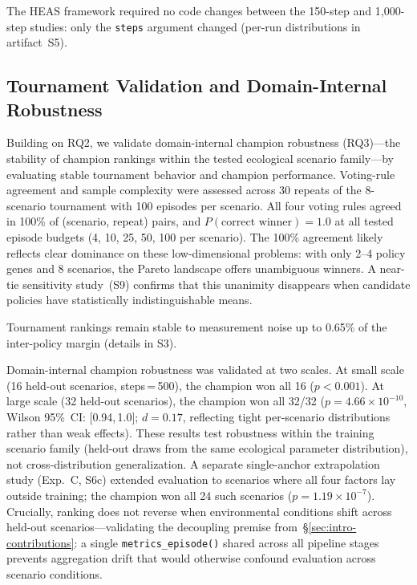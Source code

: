 \documentclass{wscpaperproc}
\begin{document}
The HEAS framework required no code changes between the 150-step
and 1,000-step studies: only the \texttt{steps} argument changed
(per-run distributions in artifact~S5).

\subsection{Tournament Validation and Domain-Internal Robustness}
\label{sec:tournament}

Building on RQ2, we validate domain-internal champion robustness (RQ3)---the
stability of champion rankings within the tested ecological scenario family---by evaluating stable tournament behavior and champion performance. Voting-rule agreement and sample complexity
were assessed across 30 repeats of
the 8-scenario tournament with 100 episodes per scenario. All four voting rules
agreed in 100\% of
(scenario, repeat) pairs, and $P(\text{correct winner})\!=\!1.0$ at all tested
episode budgets (4, 10, 25, 50, 100 per scenario). The 100\% agreement likely
reflects clear dominance on these low-dimensional problems: with only 2--4 policy
genes and 8 scenarios, the Pareto landscape offers unambiguous winners. A
near-tie sensitivity study~(S9) confirms that this unanimity disappears when
candidate policies have statistically indistinguishable means.

Tournament rankings remain stable to measurement noise up to 0.65\% of the inter-policy margin (details in S3).

Domain-internal champion robustness was validated at two scales. At small
scale (16 held-out scenarios, steps\,=\,500), the champion won all 16
($p\!<\!0.001$). At large scale (32 held-out scenarios), the champion won
all 32/32 ($p\!=\!4.66\!\times\!10^{-10}$, Wilson 95\%~CI: [0.94,\,1.0];
$d\!=\!0.17$, reflecting tight per-scenario distributions rather than weak
effects). These results test robustness within the training scenario family
(held-out draws from the same ecological parameter distribution), not
cross-distribution generalization. A separate single-anchor extrapolation
study (Exp.~C, S6c) extended evaluation to scenarios where all four
factors lay outside training; the champion won all 24 such scenarios
($p\!=\!1.19\!\times\!10^{-7}$).
Crucially, ranking does not reverse when environmental conditions shift
across held-out scenarios---validating the decoupling premise
from~\S\ref{sec:intro-contributions}: a single \texttt{metrics\_episode()}
shared across all pipeline stages prevents aggregation drift that would
otherwise confound evaluation across scenario conditions.
\end{document}
